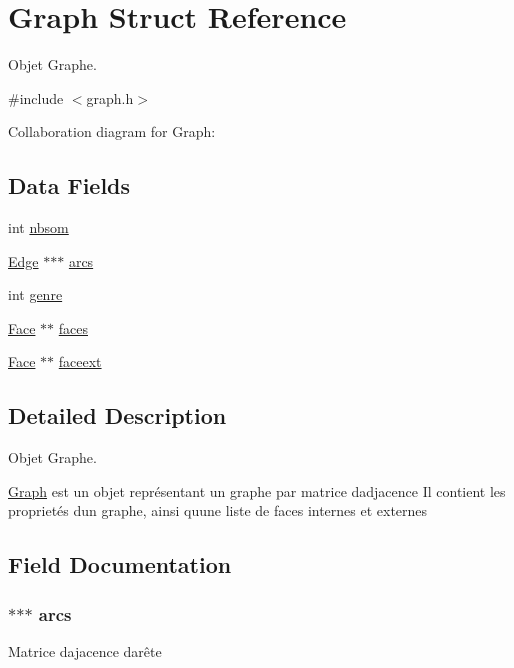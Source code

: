 \hypertarget{struct_graph}{}\section{Graph Struct Reference}
\label{struct_graph}


Objet Graphe.  




{\ttfamily \#include $<$graph.\+h$>$}



Collaboration diagram for Graph\+:
\subsection*{Data Fields}
\begin{DoxyCompactItemize}
\item 
int \hyperlink{struct_graph_a86ce04d133292adc1adeed43958d5893}{nbsom}
\item 
\hyperlink{struct_edge}{Edge} $\ast$$\ast$$\ast$ \hyperlink{struct_graph_a30d0df2228a8f19660f5d36f745ce2cd}{arcs}
\item 
int \hyperlink{struct_graph_adf148280bfaf314807caf4206cbc9049}{genre}
\item 
\hyperlink{struct_face}{Face} $\ast$$\ast$ \hyperlink{struct_graph_aadfb4851647547eb2cf7c5756ac1a13e}{faces}
\item 
\hyperlink{struct_face}{Face} $\ast$$\ast$ \hyperlink{struct_graph_a2632e9b7368ac6ede2362641736b409b}{faceext}
\end{DoxyCompactItemize}


\subsection{Detailed Description}
Objet Graphe. 

\hyperlink{struct_graph}{Graph} est un objet représentant un graphe par matrice d\textquotesingle{}adjacence Il contient les proprietés d\textquotesingle{}un graphe, ainsi qu\textquotesingle{}une liste de faces internes et externes 

\subsection{Field Documentation}
\hypertarget{struct_graph_a30d0df2228a8f19660f5d36f745ce2cd}{}
\subsubsection[{arcs}]{$\ast$$\ast$$\ast$ arcs}\label{struct_graph_a30d0df2228a8f19660f5d36f745ce2cd}
Matrice d\textquotesingle{}ajacence d\textquotesingle{}arête \hypertarget{struct_graph_a2632e9b7368ac6ede2362641736b409b}{}

